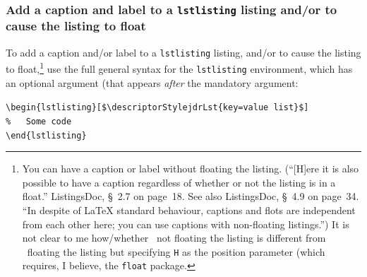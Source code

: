 \documentclass[12pt,table,final]{article}%
\begin{document}
\subsubsection{Add a caption and label to a \lstinline|lstlisting| listing and/or to cause the listing to float}
\label{section:addCaptionLabelFloatLstlisting}
To add a caption and/or label to a \lstinline|lstlisting| listing, and/or to cause the listing to float,\footnote{You can have a caption or label without floating the listing. (``[H]ere it is also possible to have a caption regardless of whether or not the listing is in a float.'' ListingsDoc, §~2.7 on page~18. See also ListingsDoc, §~4.9 on page~34. ``In despite of \LaTeX{} standard behaviour, captions and flots are independent from each other here; you can use captions with non-floating listings.'') It is not clear to me how/whether ~not floating the listing is different from ~floating the listing but specifying \lstinline|H| as the position parameter (which requires, I believe, the \lstinline|float| package.} use the full general syntax for the \lstinline|lstlisting| environment, which has an optional argument (that appears \emph{after} the mandatory argument:
\begin{jdrCodeSnip}
\lstinline[mathescape]|\begin{lstlisting}[$\descriptorStylejdrLst{key=value list}$]|\\
\lstinline$%   Some code$\\
\lstinline$\end{lstlisting}$
\end{jdrCodeSnip}
\end{document}
